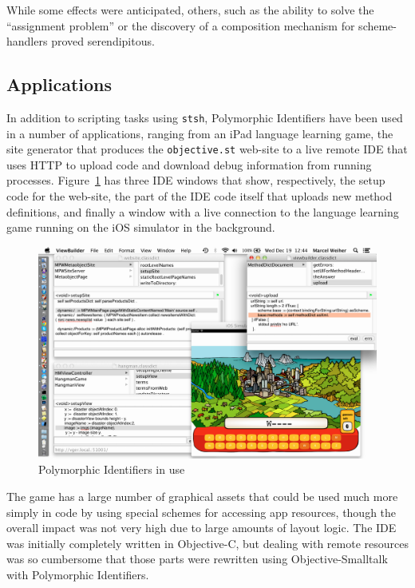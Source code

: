\documentclass{acm_proc_article-sp}
\begin{document}
While some effects were anticipated, others, such as the ability to solve the
``assignment problem'' or the discovery of a composition mechanism for
scheme-handlers proved serendipitous.  



\subsection{Applications}

In addition to scripting tasks using {\tt stsh}, Polymorphic Identifiers have been used in a number
of applications, ranging from an iPad language learning game, the site generator that produces the {\tt objective.st} web-site to a
live remote IDE that uses HTTP to upload code and download debug information from running processes.  Figure~\ref{pi-inuse}
has three IDE windows that show, respectively, the setup code for the web-site, the part of the IDE code itself that uploads new method definitions,
and finally a window with a live connection to the language learning game running on the iOS simulator in the background.

\begin{figure}[htbp]
\centering
\includegraphics[scale=0.32,page=1]{PolymorphicIdentifiersInUse.png}
\caption{Polymorphic Identifiers in use}
\label{pi-inuse}
\end{figure}


The game has a large number of graphical assets that could be used much more simply in code by using special schemes for accessing app
resources, though the overall impact was not very high due to large amounts of layout logic. 
 The IDE was initially completely written in Objective-C, but dealing with remote resources was so cumbersome that
those parts were rewritten using Objective-Smalltalk with Polymorphic Identifiers.
\end{document}
